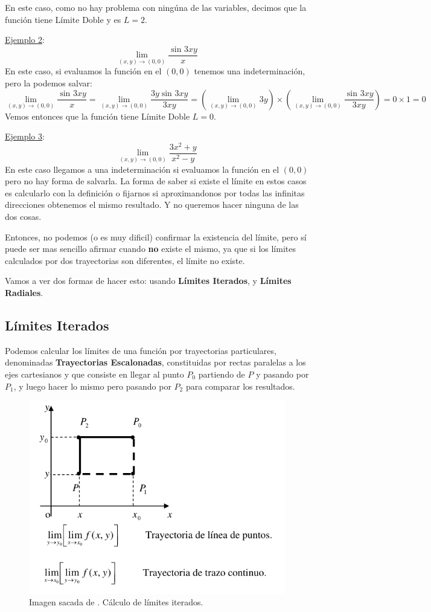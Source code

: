 \documentclass[12pt]{article}
\begin{document}
En este caso, como no hay problema con ningúna de las variables, decimos que la función tiene Límite Doble y es $ L = 2 $.

\underline{Ejemplo 2}:
\[
\lim_{(x,y) \to (0,0)}{\frac{\sin^{} 3xy}{x}}
\]
En este caso, si evaluamos la función en el $ (0,0) $ tenemos una indeterminación, pero la podemos salvar:
\[
\lim_{(x,y) \to (0,0)}{\frac{\sin^{} 3xy}{x}} = \lim_{(x,y) \to (0,0)}{\frac{3y\sin^{}3xy}{3xy}} = \left(\lim_{(x,y) \to (0,0)}{3y}\right)\times\left(\lim_{(x,y) \to (0,0)}{\frac{\sin^{}3xy}{3xy}}\right) = 0\times1 = 0
\]
Vemos entonces que la función tiene Límite Doble $ L = 0 $.

\underline{Ejemplo 3}:
\[
\lim_{(x,y) \to (0,0)}{\frac{3x^{2}+y}{x^{2}-y}}
\]
En este caso llegamos a una indeterminación si evaluamos la función en el $ (0,0) $ pero no hay forma de salvarla. La forma de saber si existe el límite en estos casos es calcularlo con la definición o fijarnos si aproximandonos por todas las infinitas direcciones obtenemos el mismo resultado. Y no queremos hacer ninguna de las dos cosas.

Entonces, no podemos (o es muy dificil) confirmar la existencia del límite, pero sí puede ser mas sencillo afirmar cuando \textbf{no} existe el mismo, ya que si los límites calculados por dos trayectorias son diferentes, el límite no existe.

Vamos a ver dos formas de hacer esto: usando \textbf{Límites Iterados}, y \textbf{Límites Radiales}.

\subsection{Límites Iterados}
Podemos calcular los límites de una función por trayectorias particulares, denominadas \textbf{Trayectorias Escalonadas}, constituidas por rectas paralelas a los ejes cartesianos y que consiste en llegar al punto $ P_{0} $ partiendo de $ P $ y pasando por $ P_{1} $, y luego hacer lo mismo pero pasando por $ P_{2} $ para comparar los resultados.

\begin{figure}[H]
  \centering
  \includegraphics[width=0.5\linewidth]{imagenes/limites_iterados.png}
  \caption{Imagen sacada de \parencite{am2monllor}. Cálculo de límites iterados.}
  \label{fig:limites_iterados}
\end{figure}
\end{document}
